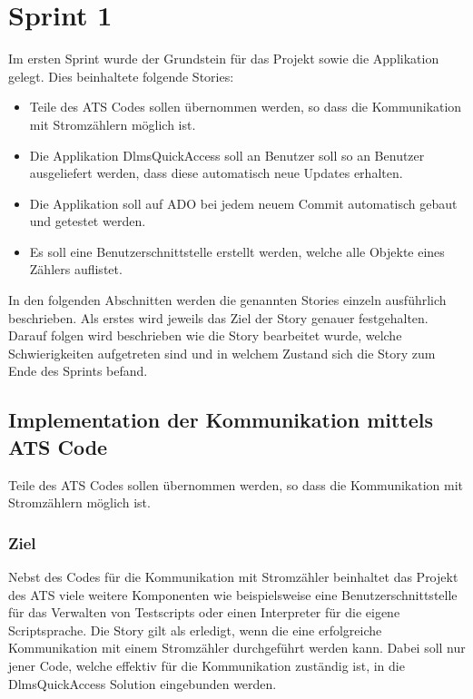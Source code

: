 \section{Sprint 1}
Im ersten Sprint wurde der Grundstein für das Projekt sowie die Applikation gelegt.
Dies beinhaltete folgende Stories:
\begin{itemize}
   \item Teile des \ac{ATS} Codes sollen übernommen werden, so dass die Kommunikation mit Stromzählern möglich ist.
   \item Die Applikation DlmsQuickAccess soll an Benutzer soll so an Benutzer ausgeliefert werden, dass diese automatisch neue Updates erhalten.
   \item Die Applikation soll auf \ac{ADO} bei jedem neuem Commit automatisch gebaut und getestet werden. 
   \item Es soll eine Benutzerschnittstelle erstellt werden, welche alle Objekte eines Zählers auflistet.
\end{itemize}
In den folgenden Abschnitten werden die genannten Stories einzeln ausführlich beschrieben.
Als erstes wird jeweils das Ziel der Story genauer festgehalten.
Darauf folgen wird beschrieben wie die Story bearbeitet wurde, welche Schwierigkeiten aufgetreten sind und in welchem Zustand sich die Story zum Ende des Sprints befand.

\subsection{Implementation der Kommunikation mittels ATS Code}\label{s1:ats}
\dq Teile des \ac{ATS} Codes sollen übernommen werden, so dass die Kommunikation mit Stromzählern möglich ist.\dq

\subsubsection{Ziel}
Nebst des Codes für die Kommunikation mit Stromzähler beinhaltet das Projekt des \ac{ATS} viele weitere Komponenten wie beispielsweise eine Benutzerschnittstelle für das Verwalten von Testscripts oder einen Interpreter für die eigene Scriptsprache.
Die Story gilt als erledigt, wenn die eine erfolgreiche Kommunikation mit einem Stromzähler durchgeführt werden kann.
Dabei soll nur jener Code, welche effektiv für die Kommunikation zuständig ist, in die DlmsQuickAccess Solution eingebunden werden. 


